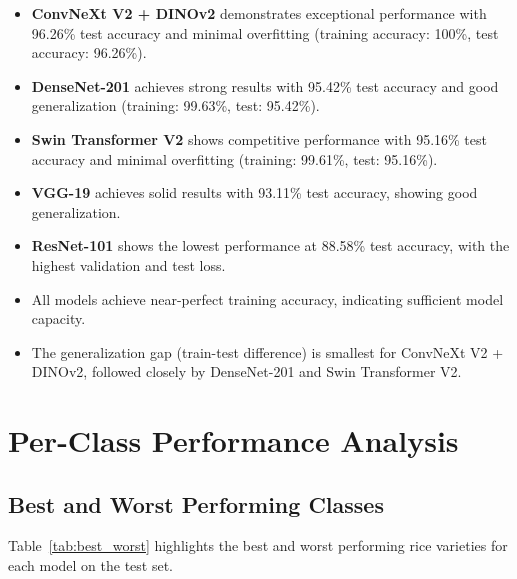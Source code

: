 \documentclass[11pt,a4paper]{article}
\begin{document}
\begin{itemize}
    \item \textbf{ConvNeXt V2 + DINOv2} demonstrates exceptional performance with 96.26\% test accuracy and minimal overfitting (training accuracy: 100\%, test accuracy: 96.26\%).
    \item \textbf{DenseNet-201} achieves strong results with 95.42\% test accuracy and good generalization (training: 99.63\%, test: 95.42\%).
    \item \textbf{Swin Transformer V2} shows competitive performance with 95.16\% test accuracy and minimal overfitting (training: 99.61\%, test: 95.16\%).
    \item \textbf{VGG-19} achieves solid results with 93.11\% test accuracy, showing good generalization.
    \item \textbf{ResNet-101} shows the lowest performance at 88.58\% test accuracy, with the highest validation and test loss.
    \item All models achieve near-perfect training accuracy, indicating sufficient model capacity.
    \item The generalization gap (train-test difference) is smallest for ConvNeXt V2 + DINOv2, followed closely by DenseNet-201 and Swin Transformer V2.
\end{itemize}

\section{Per-Class Performance Analysis}

\subsection{Best and Worst Performing Classes}

Table~\ref{tab:best_worst} highlights the best and worst performing rice varieties for each model on the test set.
\end{document}
